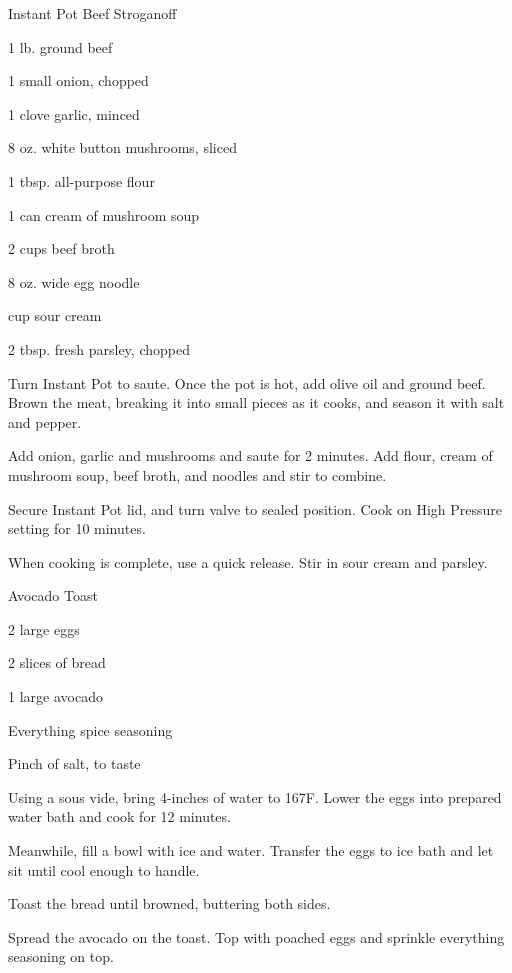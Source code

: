 \documentclass{cookbook}
\begin{document}
\begin{recipe}{Instant Pot Beef Stroganoff}

\begin{ingredients}
    \item 1 lb. ground beef
    \item 1 small onion, chopped
    \item 1 clove garlic, minced
    \item 8 oz. white button mushrooms, sliced
    \item 1 tbsp. all-purpose flour
    \item 1 can cream of mushroom soup
    \item 2  cups beef broth
    \item 8 oz. wide egg noodle
    \item {} cup sour cream
    \item 2 tbsp. fresh parsley, chopped
\end{ingredients}

Turn Instant Pot to saute. Once the pot is hot, add olive oil and ground beef. Brown the meat, breaking it into small pieces as it cooks, and season it with salt and pepper.

Add onion, garlic and mushrooms and saute for 2 minutes. Add flour, cream of mushroom soup, beef broth, and noodles and stir to combine.

Secure Instant Pot lid, and turn valve to sealed position. Cook on High Pressure setting for 10 minutes.

When cooking is complete, use a quick release. Stir in sour cream and parsley.

\end{recipe}

\begin{recipe}{Avocado Toast}

\begin{ingredients}
    \item 2 large eggs
    \item 2 slices of bread
    \item 1 large avocado
    \item Everything spice seasoning
    \item Pinch of salt, to taste
\end{ingredients}

Using a sous vide, bring 4-inches of water to 167\degree F. Lower the eggs into prepared water bath and cook for 12 minutes.

Meanwhile, fill a bowl with ice and water. Transfer the eggs to ice bath and let sit until cool enough to handle.

Toast the bread until browned, buttering both sides.

Spread the avocado on the toast. Top with poached eggs and sprinkle everything seasoning on top.

\end{recipe}
\end{document}
